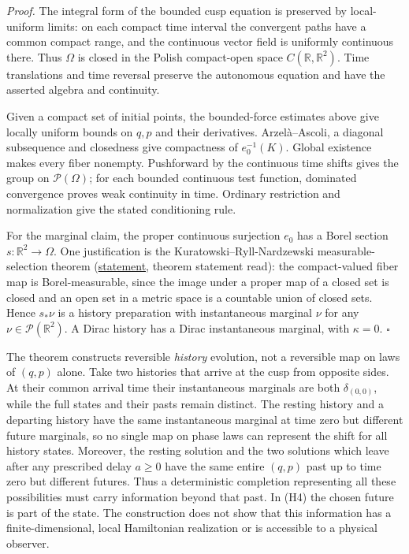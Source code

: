 \documentclass[11pt,a4paper]{article}
\begin{document}
\emph{Proof.} The integral form of the bounded cusp equation is
preserved by local-uniform limits: on each compact time interval the
convergent paths have a common compact range, and the continuous vector
field is uniformly continuous there. Thus \(\Omega\) is closed in the
Polish compact-open space \(C(\mathbb R,\mathbb R^2)\). Time
translations and time reversal preserve the autonomous equation and have
the asserted algebra and continuity.

Given a compact set of initial points, the bounded-force estimates above
give locally uniform bounds on \(q,p\) and their derivatives.
Arzelà--Ascoli, a diagonal subsequence and closedness give compactness
of \(e_0^{-1}(K)\). Global existence makes every fiber nonempty.
Pushforward by the continuous time shifts gives the group on
\(\mathcal P(\Omega)\); for each bounded continuous test function,
dominated convergence proves weak continuity in time. Ordinary
restriction and normalization give the stated conditioning rule.

For the marginal claim, the proper continuous surjection \(e_0\) has a
Borel section \(s:\mathbb R^2\to\Omega\). One justification is the
Kuratowski--Ryll-Nardzewski measurable-selection theorem
(\href{https://www.cambridge.org/core/services/aop-cambridge-core/content/view/30345D24D3DFFAAF9CE805C30EE959C6/S0008414X00041699a.pdf/some_selection_theorems_for_measurable_functions.pdf}{statement},
theorem statement read): the compact-valued fiber map is
Borel-measurable, since the image under a proper map of a closed set is
closed and an open set in a metric space is a countable union of closed
sets. Hence \(s_*\nu\) is a history preparation with instantaneous
marginal \(\nu\) for any \(\nu\in\mathcal P(\mathbb R^2)\). A Dirac
history has a Dirac instantaneous marginal, with \(\kappa=0\).
\(\square\)

The theorem constructs reversible \emph{history} evolution, not a
reversible map on laws of \((q,p)\) alone. Take two histories that
arrive at the cusp from opposite sides. At their common arrival time
their instantaneous marginals are both \(\delta_{(0,0)}\), while the
full states and their pasts remain distinct. The resting history and a
departing history have the same instantaneous marginal at time zero but
different future marginals, so no single map on phase laws can represent
the shift for all history states. Moreover, the resting solution and the
two solutions which leave after any prescribed delay \(a\ge0\) have the
same entire \((q,p)\) past up to time zero but different futures. Thus a
deterministic completion representing all these possibilities must carry
information beyond that past. In (H4) the chosen future is part of the
state. The construction does not show that this information has a
finite-dimensional, local Hamiltonian realization or is accessible to a
physical observer.
\end{document}
